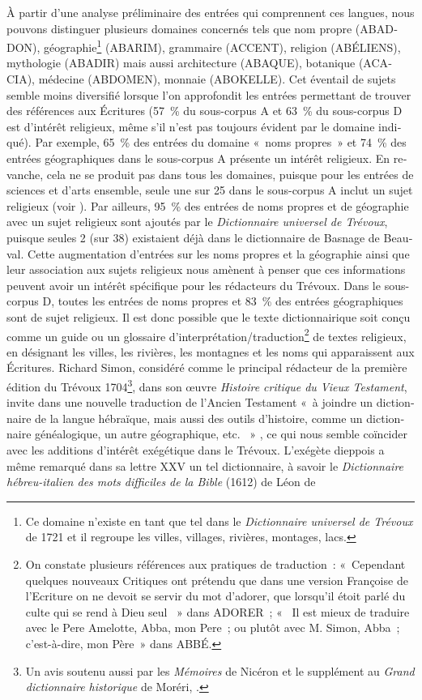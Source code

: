 \documentclass[output=paper,colorlinks,citecolor=brown,arabicfont,chinesefont,booklanguage=french]{langscibook}
\begin{document}
\begin{otherlanguage}{french}
\begin{sloppypar}
À partir d’une analyse préliminaire des entrées qui comprennent ces langues, nous pouvons distinguer plusieurs domaines concernés tels que nom propre (\mbox{ABADDON}), géographie\footnote{Ce domaine n’existe en tant que tel dans le \emph{Dictionnaire universel de Trévoux} de 1721 et il regroupe les villes, villages, rivières, montages, lacs.} (ABARIM), grammaire (ACCENT), religion (ABÉLIENS), mythologie (ABADIR) mais aussi architecture (ABAQUE), botanique (ACACIA), médecine (ABDOMEN), monnaie (ABOKELLE). Cet éventail de sujets semble moins diversifié lorsque l’on approfondit les entrées permettant de trouver des références aux Écritures (57~\% du sous-corpus A et 63~\% du sous-corpus D est d’intérêt religieux, même s’il n'est pas toujours évident par le domaine indiqué). Par exemple, 65~\% des entrées du domaine «~noms propres~» et 74~\% des entrées géographiques dans le sous-corpus A présente un intérêt religieux. En revanche, cela ne se produit pas dans tous les domaines, puisque pour les entrées de sciences et d’arts ensemble, seule une sur 25 dans le sous-corpus A inclut un sujet religieux (voir ). Par ailleurs, 95~\% des entrées de noms propres et de géographie avec un sujet religieux sont ajoutés par le \emph{Dictionnaire universel de Trévoux}, puisque seules 2 (sur 38) existaient déjà dans le dictionnaire de Basnage de Beauval. Cette augmentation d’entrées sur les noms propres et la géographie ainsi que leur association aux sujets religieux nous amènent à penser que ces informations peuvent avoir un intérêt spécifique pour les rédacteurs du Trévoux. Dans le sous-corpus D, toutes les entrées de noms propres et 83~\% des entrées géographiques sont de sujet religieux. Il est donc possible que le texte dictionnairique soit conçu comme un guide ou un glossaire d’interprétation/traduction\footnote{On constate plusieurs références aux pratiques de traduction~: «~Cependant quelques nouveaux Critiques ont prétendu que dans une version Françoise de l'Ecriture on ne devoit se servir du mot d'adorer, que lorsqu'il étoit parlé du culte qui se rend à Dieu seul ~» dans ADORER~; «~ Il est mieux de traduire avec le Pere Amelotte, Abba, mon Pere~; ou plutôt avec M. Simon, Abba~; c’est-à-dire, mon Père~» dans ABBÉ.} de textes religieux, en désignant les villes, les rivières, les montagnes et les noms qui apparaissent aux Écritures. Richard Simon, considéré comme le principal rédacteur de la première édition du Trévoux 1704\footnote{Un avis soutenu aussi par les \emph{Mémoires} de Nicéron et le supplément au \emph{Grand dictionnaire historique} de Moréri, \citet[598]{Graveleau2018}.}, dans son œuvre \emph{Histoire critique du Vieux Testament}, invite dans une nouvelle traduction de l’Ancien Testament «~à joindre un dictionnaire de la langue hébraïque, mais aussi des outils d’histoire, comme un dictionnaire généalogique, un autre géographique, etc. ~» \citep{Laplanche1994}, ce qui nous semble coïncider avec les additions d’intérêt exégétique dans le Trévoux. L’exégète dieppois a même remarqué dans sa lettre XXV \citep[220--226]{Simon1730} un tel dictionnaire, à savoir le \emph{Dictionnaire hébreu-italien des mots difficiles de la Bible} (1612) de Léon de 
\end{sloppypar}
\end{otherlanguage}
\end{document}
